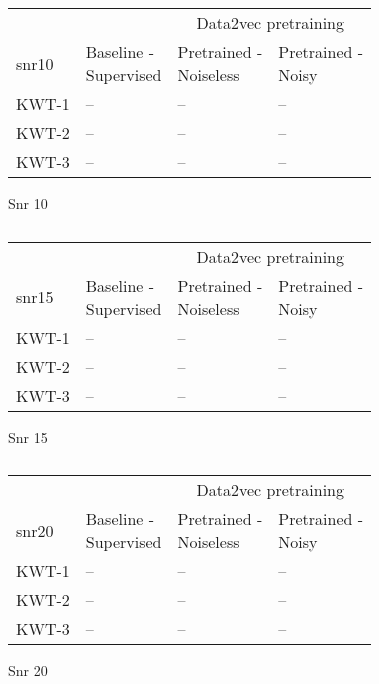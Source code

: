 \begin{table}[ht]
    \begin{subtable}[ht]{0.45\textwidth}
        \centering
        \begin{tabular}{@{}llll@{}}
        \toprule
        & & \multicolumn{2}{c}{Data2vec pretraining} \\ \cline{3-4}
        snr10    & \makecell{ Baseline - \\ Supervised } & \makecell{ Pretrained - \\ Noiseless } & \makecell{ Pretrained - \\ Noisy } \\ \midrule
        KWT-1    & --  & -- & -- \\
        KWT-2    & --  & -- & -- \\
        KWT-3    & --  & -- & -- \\
        \bottomrule
        \end{tabular}
        \caption{Snr 10}
    \end{subtable}
    \hfill
    \begin{subtable}[ht]{0.45\textwidth}
        \centering
        \begin{tabular}{@{}llll@{}}
        \toprule
        & & \multicolumn{2}{c}{Data2vec pretraining} \\ \cline{3-4}
        snr15    & \makecell{ Baseline - \\ Supervised } & \makecell{ Pretrained - \\ Noiseless } & \makecell{ Pretrained - \\ Noisy } \\ \midrule
        KWT-1    & --  & -- & -- \\
        KWT-2    & --  & -- & -- \\
        KWT-3    & --  & -- & -- \\
        \bottomrule
        \end{tabular}
        \caption{Snr 15}
    \end{subtable}

    
    \bigskip


    \begin{subtable}[ht]{0.45\textwidth}
        \centering
        \begin{tabular}{@{}llll@{}}
        \toprule
        & & \multicolumn{2}{c}{Data2vec pretraining} \\ \cline{3-4}
        snr20    & \makecell{ Baseline - \\ Supervised } & \makecell{ Pretrained - \\ Noiseless } & \makecell{ Pretrained - \\ Noisy } \\ \midrule
        KWT-1    & --  & -- & -- \\
        KWT-2    & --  & -- & -- \\
        KWT-3    & --  & -- & -- \\
        \bottomrule
        \end{tabular}
        \caption{Snr 20}
    \end{subtable}
    \caption{}
    \label{tab:test_noise_snrmix}
\end{table}


